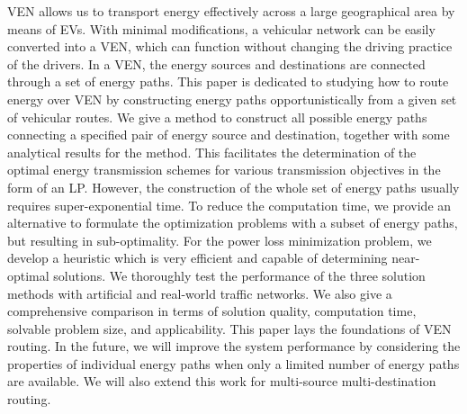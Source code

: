 \documentclass[journal]{IEEEtran}
\begin{document}
VEN allows us to transport energy effectively across a large geographical area by means of EVs. With minimal modifications, a vehicular network can be easily converted into a VEN, which can function without changing the driving practice of the drivers. In a VEN, the energy sources and destinations are connected through a set of energy paths. This paper is dedicated to studying how to route energy over VEN by constructing energy paths opportunistically from a given set of vehicular routes. We give a method to construct all possible energy paths connecting a specified pair of energy source and destination, together with some analytical results for the method. This facilitates the determination of the optimal energy transmission schemes for various transmission objectives in the form of an LP. However, the construction of the whole set of energy paths usually requires super-exponential time. To reduce the computation time, we provide an alternative to formulate the optimization problems with a subset of energy paths,  but resulting in sub-optimality. For the power loss minimization problem, we develop a heuristic which is very efficient and capable of determining near-optimal solutions. We thoroughly test the performance of the three solution methods with artificial and real-world traffic networks. We also give a comprehensive comparison in terms of solution quality, computation time, solvable problem size, and applicability. This paper lays the foundations of VEN routing. In the future, we will improve the system performance by considering the properties of individual energy paths when only a limited number of energy paths are available. We will also extend this work for multi-source multi-destination routing.















\ifCLASSOPTIONcaptionsoff
  \newpage
\fi





\end{document}
